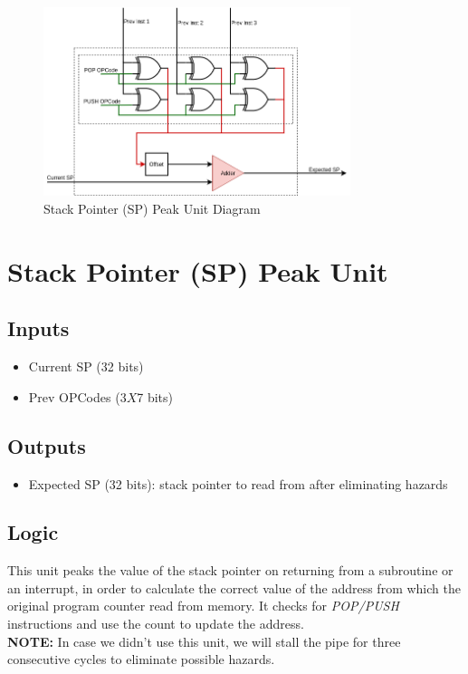 \documentclass[12pt]{report}
\begin{document}
\begin{center}
    \begin{figure}[hp]
        \centering
        \includegraphics[width=0.8\textwidth]{pspu}
        \caption{Stack Pointer (SP) Peak Unit Diagram}
        \label{fig:pspu}
    \end{figure}
\end{center}

\section{Stack Pointer (SP) Peak Unit}

\subsection{Inputs}
\begin{itemize}
    \item Current SP (32 bits)
    \item Prev OPCodes (3$X$7 bits)
\end{itemize}

\subsection{Outputs}
\begin{itemize}
    \item Expected SP (32 bits): stack pointer to read from after eliminating hazards
\end{itemize}

\subsection{Logic}
This unit peaks the value of the stack pointer on returning from a subroutine or an interrupt, in order to calculate the correct value of the address from which the original program counter read from memory. It checks for \emph{POP/PUSH} instructions and use the count to update the address.\\
\textbf{NOTE:} In case we didn't use this unit, we will stall the pipe for three consecutive cycles to eliminate possible hazards.
\end{document}
